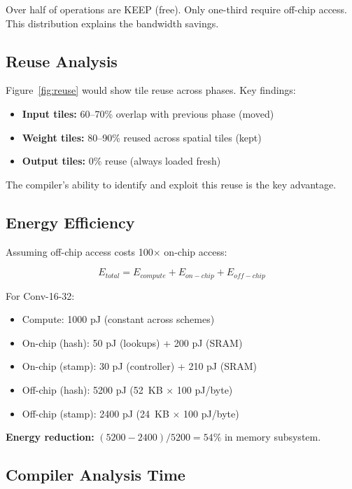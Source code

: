 \documentclass[conference]{IEEEtran}
\begin{document}
Over half of operations are KEEP (free). Only one-third require off-chip access. This distribution explains the bandwidth savings.

\subsection{Reuse Analysis}

Figure~\ref{fig:reuse} would show tile reuse across phases. Key findings:
\begin{itemize}
\item \textbf{Input tiles:} 60--70\% overlap with previous phase (moved)
\item \textbf{Weight tiles:} 80--90\% reused across spatial tiles (kept)
\item \textbf{Output tiles:} 0\% reuse (always loaded fresh)
\end{itemize}

The compiler's ability to identify and exploit this reuse is the key advantage.

\subsection{Energy Efficiency}

Assuming off-chip access costs 100$\times$ on-chip access:

\begin{equation}
E_{total} = E_{compute} + E_{on-chip} + E_{off-chip}
\end{equation}

For Conv-16-32:
\begin{itemize}
\item Compute: 1000 pJ (constant across schemes)
\item On-chip (hash): 50 pJ (lookups) + 200 pJ (SRAM)
\item On-chip (stamp): 30 pJ (controller) + 210 pJ (SRAM)
\item Off-chip (hash): 5200 pJ (52~KB $\times$ 100 pJ/byte)
\item Off-chip (stamp): 2400 pJ (24~KB $\times$ 100 pJ/byte)
\end{itemize}

\textbf{Energy reduction:} $(5200-2400)/5200 = 54\%$ in memory subsystem.

\subsection{Compiler Analysis Time}
\end{document}
